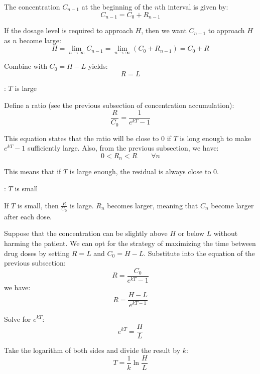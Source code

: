     \par The concentration $C_{n - 1}$ at the beginning of the $n$th interval is given by:
      \[
        C_{n - 1} = C_0 + R_{n - 1}
        \]
    \par If the dosage level is required to approach $H$, then we want $C_{n - 1}$ to approach $H$ as $n$ become large:
      \[
        H = \lim\limits_{n \to \infty} C_{n - 1} = \lim\limits_{n \to \infty} (C_0 + R_{n - 1}) = C_0 + R
        \]
    \par Combine with $C_0 = H - L$ yields:
      \[
        R = L
      \]
    \par {}: $T$ is large
    \par Define a ratio (see the previous subsection of concentration accumulation):
      \[
        \frac{R}{C_0} = \frac{1}{e^{kT} - 1}
        \]
    \par This equation states that the ratio will be close to $0$ if $T$ is long enough to make $e^{kT} - 1$ sufficiently large. Also, from the previous subsection, we have:
      \[
        0 < R_n < R \qquad \forall n
        \]
    \par This means that if $T$ is large enough, the residual is always close to $0$.
    \par {}: $T$ is small
    \par If $T$ is small, then $\frac{R}{C_0}$ is large. $R_n$ becomes larger, meaning that $C_n$ become larger after each dose.
    \par Suppose that the concentration can be slightly above $H$ or below $L$ without harming the patient. We can opt for the strategy of maximizing the time between drug doses by setting $R = L$ and $C_0 = H - L$. Substitute into the equation of the previous subsection:
      \[
        R = \frac{C_0}{e^{kT} - 1}
      \]
      we have:
      \[
        R = \frac{H - L}{e^{kT - 1}}
        \]
    \par Solve for $e^{kT}$:
      \[
        e^{kT} = \frac{H}{L}
        \]
    \par Take the logarithm of both sides and divide the result by $k$:
    \[
      T = \frac{1}{k} \ln\frac{H}{L}
      \]

